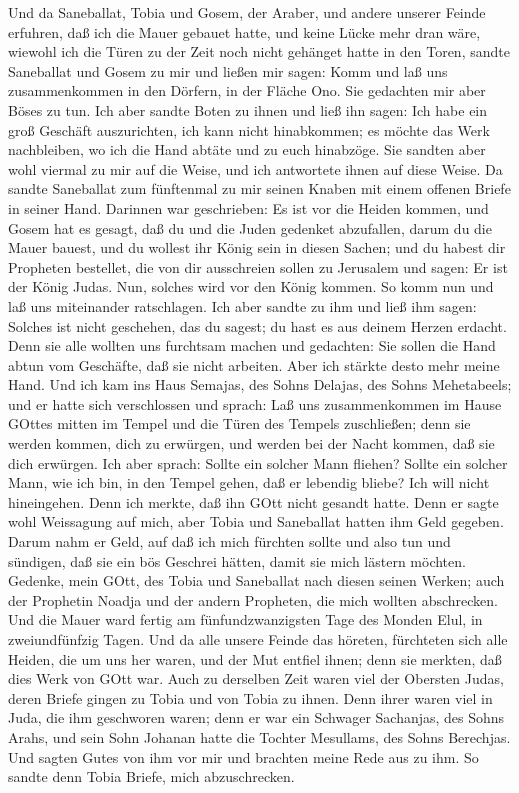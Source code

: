  Und da Saneballat, Tobia und Gosem, der Araber, und andere
unserer Feinde erfuhren, daß ich die Mauer gebauet hatte, und keine
Lücke mehr dran wäre, wiewohl ich die Türen zu der Zeit noch nicht
gehänget hatte in den Toren,  sandte Saneballat und Gosem zu
mir und ließen mir sagen: Komm und laß uns zusammenkommen in den
Dörfern, in der Fläche Ono. Sie gedachten mir aber Böses zu tun.
 Ich aber sandte Boten zu ihnen und ließ ihn sagen: Ich habe
ein groß Geschäft auszurichten, ich kann nicht hinabkommen; es möchte
das Werk nachbleiben, wo ich die Hand abtäte und zu euch hinabzöge.
 Sie sandten aber wohl viermal zu mir auf die Weise, und ich
antwortete ihnen auf diese Weise.  Da sandte Saneballat zum
fünftenmal zu mir seinen Knaben mit einem offenen Briefe in seiner Hand.
 Darinnen war geschrieben: Es ist vor die Heiden kommen, und
Gosem hat es gesagt, daß du und die Juden gedenket abzufallen, darum du
die Mauer bauest, und du wollest ihr König sein in diesen Sachen;
 und du habest dir Propheten bestellet, die von dir
ausschreien sollen zu Jerusalem und sagen: Er ist der König Judas. Nun,
solches wird vor den König kommen. So komm nun und laß uns miteinander
ratschlagen.  Ich aber sandte zu ihm und ließ ihm sagen:
Solches ist nicht geschehen, das du sagest; du hast es aus deinem Herzen
erdacht.  Denn sie alle wollten uns furchtsam machen und
gedachten: Sie sollen die Hand abtun vom Geschäfte, daß sie nicht
arbeiten. Aber ich stärkte desto mehr meine Hand.  Und ich
kam ins Haus Semajas, des Sohns Delajas, des Sohns Mehetabeels; und er
hatte sich verschlossen und sprach: Laß uns zusammenkommen im Hause
GOttes mitten im Tempel und die Türen des Tempels zuschließen; denn sie
werden kommen, dich zu erwürgen, und werden bei der Nacht kommen, daß
sie dich erwürgen.  Ich aber sprach: Sollte ein solcher
Mann fliehen? Sollte ein solcher Mann, wie ich bin, in den Tempel gehen,
daß er lebendig bliebe? Ich will nicht hineingehen.  Denn
ich merkte, daß ihn GOtt nicht gesandt hatte. Denn er sagte wohl
Weissagung auf mich, aber Tobia und Saneballat hatten ihm Geld gegeben.
 Darum nahm er Geld, auf daß ich mich fürchten sollte und
also tun und sündigen, daß sie ein bös Geschrei hätten, damit sie mich
lästern möchten.  Gedenke, mein GOtt, des Tobia und
Saneballat nach diesen seinen Werken; auch der Prophetin Noadja und der
andern Propheten, die mich wollten abschrecken.  Und die
Mauer ward fertig am fünfundzwanzigsten Tage des Monden Elul, in
zweiundfünfzig Tagen.  Und da alle unsere Feinde das
höreten, fürchteten sich alle Heiden, die um uns her waren, und der Mut
entfiel ihnen; denn sie merkten, daß dies Werk von GOtt war.
 Auch zu derselben Zeit waren viel der Obersten Judas,
deren Briefe gingen zu Tobia und von Tobia zu ihnen.  Denn
ihrer waren viel in Juda, die ihm geschworen waren; denn er war ein
Schwager Sachanjas, des Sohns Arahs, und sein Sohn Johanan hatte die
Tochter Mesullams, des Sohns Berechjas.  Und sagten Gutes
von ihm vor mir und brachten meine Rede aus zu ihm. So sandte denn Tobia
Briefe, mich abzuschrecken.


